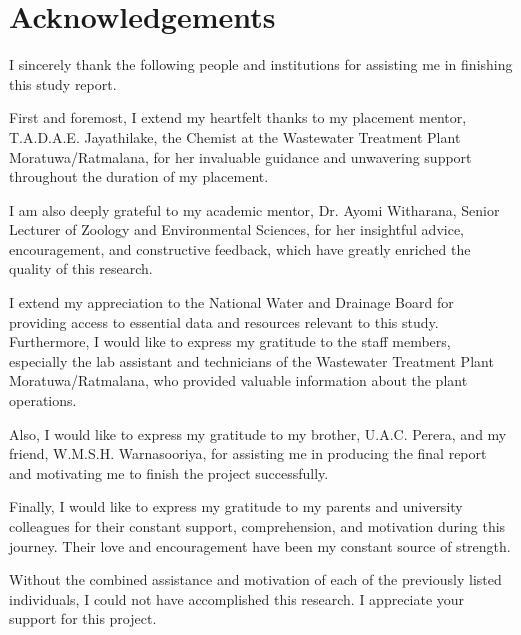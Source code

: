 \newpage
\section*{\centering Acknowledgements}

I sincerely thank the following people and institutions for assisting me in finishing this study report.

First and foremost, I extend my heartfelt thanks to my placement mentor, T.A.D.A.E. Jayathilake, the Chemist at the Wastewater Treatment Plant Moratuwa/Ratmalana, for her invaluable guidance and unwavering support throughout the duration of my placement.

I am also deeply grateful to my academic mentor, Dr. Ayomi Witharana, Senior Lecturer of Zoology and Environmental Sciences, for her insightful advice, encouragement, and constructive feedback, which have greatly enriched the quality of this research.

I extend my appreciation to the National Water and Drainage Board for providing access to essential data and resources relevant to this study. Furthermore, I would like to express my gratitude to the staff members, especially the lab assistant and technicians of the Wastewater Treatment Plant Moratuwa/Ratmalana, who provided valuable information about the plant operations.

Also, I would like to express my gratitude to my brother, U.A.C. Perera, and my friend, W.M.S.H. Warnasooriya, for assisting me in producing the final report and motivating me to finish the project successfully.

Finally, I would like to express my gratitude to my parents and university colleagues for their constant
support, comprehension, and motivation during this journey. Their love and encouragement have been my constant source of strength.

Without the combined assistance and motivation of each of the previously listed individuals, I could not have accomplished this research. I appreciate your support for this project.

\clearpage